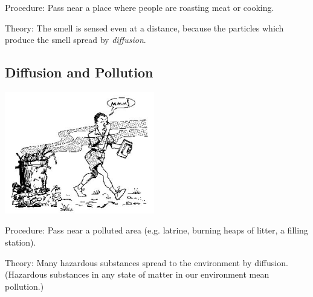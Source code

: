 \begin{multicols}{2}
\begin{description*}
\item[Procedure:]{Pass near a place where people are roasting meat or cooking.}
\item[Theory:]{The smell is sensed even at a distance, because the particles which produce the smell
spread by \emph{diffusion}.}
\end{description*}

\subsection{Diffusion and Pollution} 

\begin{center}
\includegraphics[width=0.49\textwidth]{./img/source/diffusion-pollution.jpg}
\end{center}

\begin{description*}
\item[Procedure:]{Pass near a polluted area (e.g. latrine, burning heaps of litter, a filling station).}
\item[Theory:]{Many hazardous substances spread to the environment by diffusion. (Hazardous
substances in any state of matter in our environment mean pollution.)}
\end{description*}


\end{multicols}
